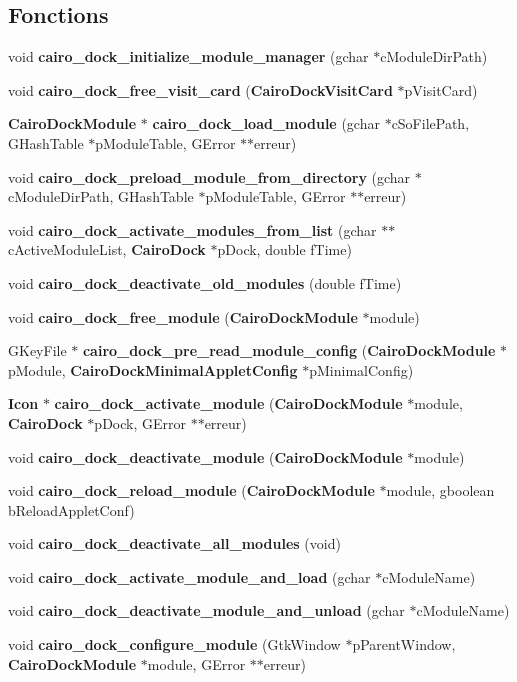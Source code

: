 \subsection*{Fonctions}
\begin{CompactItemize}
\item 
void {\bf cairo\_\-dock\_\-initialize\_\-module\_\-manager} (gchar $\ast$cModuleDirPath)
\item 
void {\bf cairo\_\-dock\_\-free\_\-visit\_\-card} ({\bf CairoDockVisitCard} $\ast$pVisitCard)
\item 
{\bf CairoDockModule} $\ast$ {\bf cairo\_\-dock\_\-load\_\-module} (gchar $\ast$cSoFilePath, GHashTable $\ast$pModuleTable, GError $\ast$$\ast$erreur)
\item 
void {\bf cairo\_\-dock\_\-preload\_\-module\_\-from\_\-directory} (gchar $\ast$cModuleDirPath, GHashTable $\ast$pModuleTable, GError $\ast$$\ast$erreur)
\item 
void {\bf cairo\_\-dock\_\-activate\_\-modules\_\-from\_\-list} (gchar $\ast$$\ast$cActiveModuleList, {\bf CairoDock} $\ast$pDock, double fTime)
\item 
void {\bf cairo\_\-dock\_\-deactivate\_\-old\_\-modules} (double fTime)
\item 
void {\bf cairo\_\-dock\_\-free\_\-module} ({\bf CairoDockModule} $\ast$module)
\item 
GKeyFile $\ast$ {\bf cairo\_\-dock\_\-pre\_\-read\_\-module\_\-config} ({\bf CairoDockModule} $\ast$pModule, {\bf CairoDockMinimalAppletConfig} $\ast$pMinimalConfig)
\item 
{\bf Icon} $\ast$ {\bf cairo\_\-dock\_\-activate\_\-module} ({\bf CairoDockModule} $\ast$module, {\bf CairoDock} $\ast$pDock, GError $\ast$$\ast$erreur)
\item 
void {\bf cairo\_\-dock\_\-deactivate\_\-module} ({\bf CairoDockModule} $\ast$module)
\item 
void {\bf cairo\_\-dock\_\-reload\_\-module} ({\bf CairoDockModule} $\ast$module, gboolean bReloadAppletConf)
\item 
void {\bf cairo\_\-dock\_\-deactivate\_\-all\_\-modules} (void)
\item 
void {\bf cairo\_\-dock\_\-activate\_\-module\_\-and\_\-load} (gchar $\ast$cModuleName)
\item 
void {\bf cairo\_\-dock\_\-deactivate\_\-module\_\-and\_\-unload} (gchar $\ast$cModuleName)
\item 
void {\bf cairo\_\-dock\_\-configure\_\-module} (GtkWindow $\ast$pParentWindow, {\bf CairoDockModule} $\ast$module, GError $\ast$$\ast$erreur)
$$
\end{CompactItemize}
